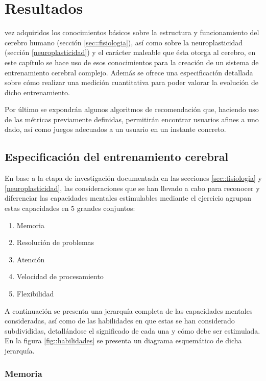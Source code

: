 \chapter{Resultados}
\label{chap:resultados}

 vez adquiridos los conocimientos básicos sobre la estructura y funcionamiento del cerebro humano (sección \ref{sec::fisiologia}), así como sobre la neuroplasticidad (sección \ref{neuroplasticidad}) y el carácter maleable que ésta otorga al cerebro, en este capítulo se hace uso de esos conocimientos para la creación de un sistema de entrenamiento cerebral complejo. Además se ofrece una especificación detallada sobre cómo realizar una medición cuantitativa para poder valorar la evolución de dicho entrenamiento.

Por último se expondrán algunos algoritmos de recomendación que, haciendo uso de las métricas previamente definidas, permitirán encontrar usuarios afines a uno dado, así como juegos adecuados a un usuario en un instante concreto.

\section{Especificación del entrenamiento cerebral}
\label{sec:entrenamiento}
En base a la etapa de investigación documentada en las secciones \ref{sec::fisiologia} y \ref{neuroplasticidad}, las consideraciones que se han llevado a cabo para reconocer y diferenciar las capacidades mentales estimulables mediante el ejercicio agrupan estas capacidades en 5 grandes conjuntos:

\renewcommand{\labelenumi}{\bf\arabic{enumi}. }
\begin{enumerate}
\item Memoria
\item Resolución de problemas
\item Atención
\item Velocidad de procesamiento
\item Flexibilidad
\end{enumerate}

A continuación se presenta una jerarquía completa de las capacidades mentales consideradas, así como de las habilidades en que estas se han considerado subdivididas, detallándose el significado de cada una y cómo debe ser estimulada. En la figura \ref{fig::habilidades} se presenta un diagrama esquemático de dicha jerarquía.

\subsection{Memoria}

